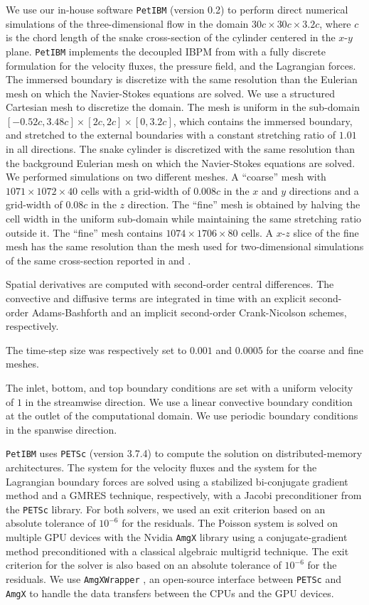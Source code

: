 \documentclass[12pt]{article}
\newcommand{\petibm}{\texttt{PetIBM} }
\newcommand{\petsc}{\texttt{PETSc} }
\newcommand{\amgx}{\texttt{AmgX} }
\newcommand{\amgxwrapper}{\texttt{AmgXWrapper} }
\begin{document}
We use our in-house software \petibm (version 0.2) to perform direct numerical simulations of the three-dimensional flow in the domain $30c \times 30c \times 3.2c$, where $c$ is the chord length of the snake cross-section of the cylinder centered in the $x$-$y$ plane.
\petibm implements the decoupled IBPM from \cite{Li_et_al_2016} with a fully discrete formulation for the velocity fluxes, the pressure field, and the Lagrangian forces.
The immersed boundary is discretize with the same resolution than the Eulerian mesh on which the Navier-Stokes equations are solved.
We use a structured Cartesian mesh to discretize the domain.
The mesh is uniform in the sub-domain $\left[-0.52c, 3.48c\right]\times\left[2c, 2c\right]\times\left[0, 3.2c\right]$, which contains the immersed boundary, and stretched to the external boundaries with a constant stretching ratio of $1.01$ in all directions.
The snake cylinder is discretized with the same resolution than the background Eulerian mesh on which the Navier-Stokes equations are solved.
We performed simulations on two different meshes.
A ``coarse'' mesh with $1071\times1072\times40$ cells with a grid-width of $0.008c$ in the $x$ and $y$ directions and a grid-width of $0.08c$ in the $z$ direction.
The ``fine'' mesh is obtained by halving the cell width in the uniform sub-domain while maintaining the same stretching ratio outside it.
The ``fine'' mesh contains $1074\times1706\times80$ cells.
A $x$-$z$ slice of the fine mesh has the same resolution than the mesh used for two-dimensional simulations of the same cross-section reported in \cite{Krishnan_et_al_2014} and \cite{Mesnard_Barba_2017}.

Spatial derivatives are computed with second-order central differences.
The convective and diffusive terms are integrated in time with an explicit second-order Adams-Bashforth and an implicit second-order Crank-Nicolson schemes, respectively.

The time-step size was respectively set to $0.001$ and $0.0005$ for the coarse and fine meshes.

The inlet, bottom, and top boundary conditions are set with a uniform velocity of $1$ in the streamwise direction.
We use a linear convective boundary condition at the outlet of the computational domain.
We use periodic boundary conditions in the spanwise direction.

\petibm uses \petsc (version 3.7.4) to compute the solution on distributed-memory architectures.
The system for the velocity fluxes and the system for the Lagrangian boundary forces are solved using a stabilized bi-conjugate gradient method and a GMRES technique, respectively, with a Jacobi preconditioner from the \petsc library.
For both solvers, we used an exit criterion based on an absolute tolerance of $10^{-6}$ for the residuals.
The Poisson system is solved on multiple GPU devices with the Nvidia \amgx library using a conjugate-gradient method preconditioned with a classical algebraic multigrid technique.
The exit criterion for the solver is also based on an absolute tolerance of $10^{-6}$ for the residuals.
We use \amgxwrapper, an open-source interface between \petsc and \amgx to handle the data transfers between the CPUs and the GPU devices.
\end{document}
